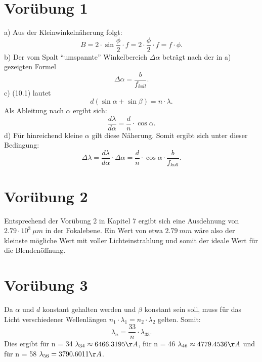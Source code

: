 \documentclass[titlepage]{scrartcl}
\begin{document}
\section{Vorübung 1}
a) Aus der Kleinwinkelnäherung folgt: 
\begin{equation}
B = 2\cdot \sin{\frac{\phi}{2}} \cdot f = 2 \cdot \frac{\phi}{2} \cdot f = f \cdot \phi.
\end{equation}
b) Der vom Spalt \enquote{umspannte} Winkelbereich $\Delta \alpha $ beträgt nach der in a) gezeigten Formel 
\begin{equation}
\Delta \alpha = \frac{b}{f_{koll}}.
\end{equation}
c) (10.1) lautet 
\begin{equation}
d(\sin \alpha  + \sin \beta) = n \cdot \lambda. 
\end{equation}
Als Ableitung nach $\alpha$ ergibt sich:
\begin{equation}
\frac{d\lambda}{d\alpha} = \frac{d}{n} \cdot \cos{\alpha}.
\end{equation}
d) Für hinreichend kleine $\alpha$ gilt diese Näherung. Somit ergibt sich unter dieser Bedingung:
\begin{equation}
\Delta \lambda = \frac{d\lambda}{d\alpha} \cdot \Delta \alpha = \frac{d}{n} \cdot \cos{\alpha} \cdot \frac{b}{f_{koll}}.
\end{equation} 
\section{Vorübung 2}
Entsprechend der Vorübung 2 in Kapitel 7 ergibt sich eine Ausdehnung von $2.79 \cdot 10^3\ \mu m$ in der Fokalebene. Ein Wert von etwa $2.79\ mm$ wäre also der kleinste mögliche Wert mit voller Lichteinstrahlung und somit der ideale Wert für die Blendenöffnung. 
\section{Vorübung 3}
Da $\alpha$ und $d$ konstant gehalten werden und $\beta$ konstant sein soll, muss für das Licht verschiedener Wellenlängen $n_1 \cdot \lambda_1 = n_2 \cdot \lambda_2$ gelten. 
Somit: 
\begin{equation}
\lambda_n = \frac{33}{n} \cdot \lambda_{33}.
\end{equation}
Dies ergibt für n = 34 $\lambda_{34} \approx 6466.3195 \AA$, für n = 46 $\lambda_{46} \approx 4779.4536 \AA$ und für n = 58 $\lambda_{56} = 3790.6011 \AA$. 
\end{document}
